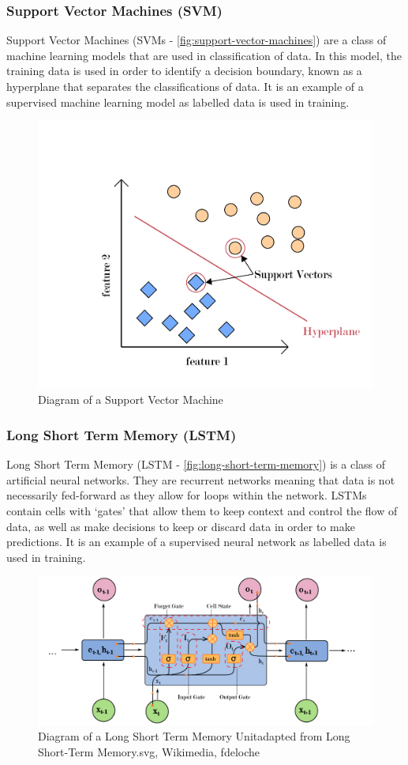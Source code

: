 \subsubsection{Support Vector Machines (SVM)}
Support Vector Machines (SVMs - \autoref{fig:support-vector-machines}) are a class of machine learning models that are used in classification
of data. In this model, the training data is used in order to identify a decision boundary, known as
a hyperplane that separates the classifications of data. It is an example of a supervised machine
learning model as labelled data is used in training.
\begin{figure}[hbt!]
    \centering
    \includegraphics[width=0.6\columnwidth]{figures/support-vector-machines.pdf}
    \caption[Diagram of a Support Vector Machine]{Diagram of a Support Vector Machine}
    \label{fig:support-vector-machines}
\end{figure}
\FloatBarrier

\subsubsection{Long Short Term Memory (LSTM)}
Long Short Term Memory (LSTM - \autoref{fig:long-short-term-memory}) is a class of artificial neural networks. They are recurrent
networks meaning that data is not necessarily fed-forward as they allow for loops within the
network. LSTMs contain cells with `gates' that allow them to keep context and control the flow of data,
as well as make decisions to keep or discard data in order to make predictions. It is an example of a supervised neural network as labelled data is used in training.

\begin{figure}[hbt!]
    \centering
    \includegraphics[width=\columnwidth]{figures/long-short-term-memory.pdf}
    \caption[Diagram of a LSTM Unit]{Diagram of a Long Short Term Memory Unitadapted from Long Short-Term Memory.svg, Wikimedia, fdeloche}
    \label{fig:long-short-term-memory}
\end{figure}
\FloatBarrier

